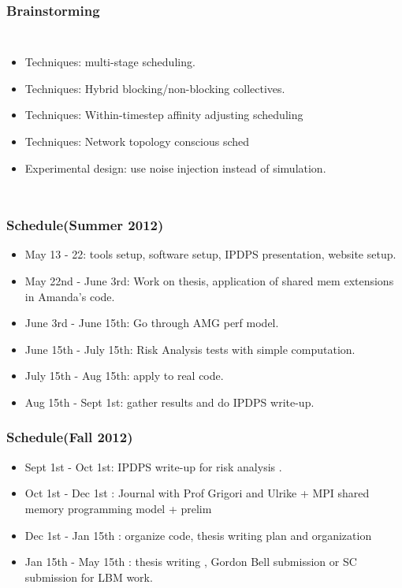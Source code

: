 \begin{frame}
\frametitle{Brainstorming}
\begin{columns} %
\begin{itemize} 
\tiny \item \tiny Techniques: multi-stage scheduling.  \\
\item \tiny  Techniques: Hybrid blocking/non-blocking collectives.   \\
\item \tiny  Techniques: Within-timestep affinity adjusting scheduling    \\
 \item \tiny Techniques: Network topology conscious sched \\
\item \tiny Experimental design:  use noise injection instead of simulation. 
\end{itemize}
\end{columns} 
\end{frame} 

\begin{frame}
\frametitle{Schedule(Summer 2012)}
\begin{itemize}
\tiny \item \tiny May 13 - 22:  tools setup, software setup, IPDPS presentation, website setup. \\
\item \tiny May 22nd - June 3rd: Work on thesis, application of shared mem extensions in Amanda's code. \\
\item \tiny June 3rd - June 15th: Go through AMG perf model. \\
\item \tiny June 15th - July 15th: Risk Analysis tests with simple computation. \\ 
\item \tiny July 15th - Aug 15th: apply to real code. \\
\item \tiny Aug 15th - Sept 1st: gather results and do IPDPS write-up. \\
\end{itemize} 
\end{frame} 

\begin{frame} 
\frametitle{Schedule(Fall 2012)}
\begin{itemize}
\tiny \item \tiny Sept 1st - Oct 1st: IPDPS write-up for risk analysis .
\item \tiny Oct 1st - Dec 1st : Journal with Prof Grigori and Ulrike + MPI shared memory programming model + prelim  
\item \tiny Dec 1st - Jan 15th : organize code, thesis writing plan and organization
\item \tiny Jan 15th - May 15th : thesis writing ,  Gordon Bell submission or SC submission for LBM work.   
\end{itemize} 
\end{frame} 

